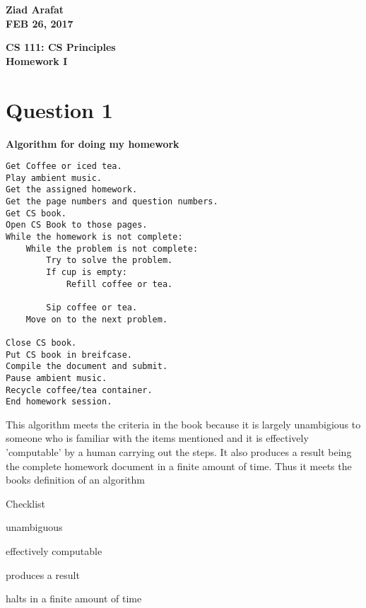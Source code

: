 \documentclass{article}%
\begin{document}
\begin{flushright}
\textbf{Ziad Arafat \\
FEB 26, 2017}
\end{flushright}

\begin{center}
\textbf{CS 111: CS Principles \\
Homework I} \\
\end{center}

\section{Question 1}

\begin{Large}
\textbf{Algorithm for doing my homework}
\end{Large}


\begin{lstlisting}
Get Coffee or iced tea.
Play ambient music.
Get the assigned homework.
Get the page numbers and question numbers.
Get CS book.
Open CS Book to those pages.
While the homework is not complete:
	While the problem is not complete:
		Try to solve the problem.
		If cup is empty:
			Refill coffee or tea.
		
		Sip coffee or tea.
	Move on to the next problem.
	
Close CS book.
Put CS book in breifcase.
Compile the document and submit.
Pause ambient music.
Recycle coffee/tea container.
End homework session.
\end{lstlisting}

This algorithm meets the criteria in the book because it is largely unambigious to someone who is familiar with the items mentioned and it is effectively 'computable' by a human carrying out the steps. It also produces a result being the complete homework document in a finite amount of time. Thus it meets the books definition of an algorithm\newline

\begin{large}
Checklist
\end{large}

\begin{todolist}
\item unambiguous
\item effectively computable
\item produces a result
\item halts in a finite amount of time
\end{todolist}
\end{document}
